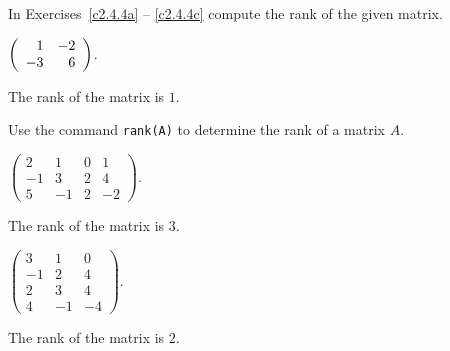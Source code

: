 \documentclass{ximera}
\begin{document}
\noindent In Exercises~\ref{c2.4.4a} -- \ref{c2.4.4c} compute the rank of
the given matrix.
\begin{computerExercise} \label{c2.4.4a}
$\left(\begin{array}{rr} 1 & -2\\ -3 &6\end{array}\right)$.

\begin{solution}
\ans The rank of the matrix is $1$.

\soln Use the \Matlab command {\tt rank(A)} to determine the rank of a 
matrix $A$.

\end{solution}
\end{computerExercise}
\begin{computerExercise} \label{c2.4.4b}
$\left(\begin{array}{rrrr} 2 & 1 & 0 & 1\\
	-1 & 3 & 2 & 4\\ 5 & -1 & 2 & -2\end{array}\right)$.

\begin{solution}
The rank of the matrix is $3$.

\end{solution}
\end{computerExercise}
\begin{computerExercise} \label{c2.4.4c}
$\left(\begin{array}{rrr} 3 & 1 & 0 \\
	-1 & 2 & 4\\ 2 & 3 & 4 \\ 4 & -1 & -4 \end{array}\right)$.

\begin{solution}
The rank of the matrix is $2$.
\end{solution}
\end{computerExercise}
\end{document}
